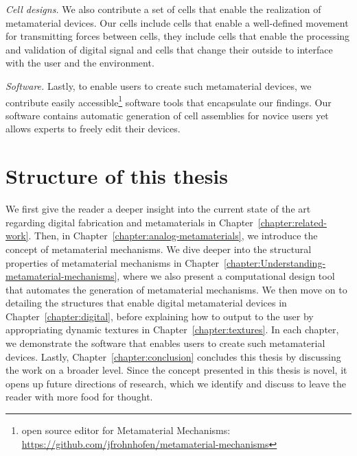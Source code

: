 \textit{Cell designs.} \enspace We also contribute a set of cells that enable the realization of metamaterial devices. Our cells include cells that enable a well-defined movement for transmitting forces between cells, they include cells that enable the processing and validation of digital signal and cells that change their outside to interface with the user and the environment.

\textit{Software.} \enspace Lastly, to enable users to create such metamaterial devices, we contribute easily accessible\footnote{open source editor for Metamaterial Mechanisms: \url{https://github.com/jfrohnhofen/metamaterial-mechanisms}} software tools that encapsulate our findings. Our software contains automatic generation of cell assemblies for novice users yet allows experts to freely edit their devices.



\section{Structure of this thesis}

We first give the reader a deeper insight into the current state of the art regarding digital fabrication and metamaterials in Chapter~\ref{chapter:related-work}. Then, in Chapter~\ref{chapter:analog-metamaterials}, we introduce the concept of metamaterial mechanisms. We dive deeper into the structural properties of metamaterial mechanisms in Chapter~\ref{chapter:Understanding-metamaterial-mechanisms}, where we also present a computational design tool that automates the generation of metamaterial mechanisms. We then move on to detailing the structures that enable digital metamaterial devices in Chapter~\ref{chapter:digital}, before explaining how to output to the user by appropriating dynamic textures in Chapter~\ref{chapter:textures}. 
In each chapter, we demonstrate the software that enables users to create such metamaterial devices. 
Lastly, Chapter~\ref{chapter:conclusion} concludes this thesis by discussing the work on a broader level. Since the concept presented in this thesis is novel, it opens up future directions of research, which we  identify and discuss to leave the reader with more food for thought. 



















